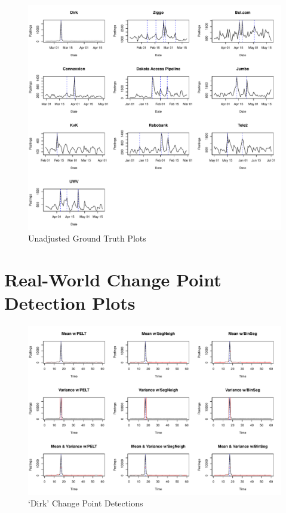 \documentclass{uvamscse}	%
\begin{document}
\begin{figure}[h]
    \includegraphics[width=\textwidth]{figures/GroundTruthAnnotations}
    \caption{Unadjusted Ground Truth Plots}
    \label{fig:truth1}
\end{figure}

\chapter{Real-World Change Point Detection Plots}
\label{changeplots}

\begin{figure}[h]
    \includegraphics[width=\textwidth]{figures/dirkresults}
    \caption{`Dirk' Change Point Detections}
    \label{fig:dirk}
\end{figure}
\end{document}
